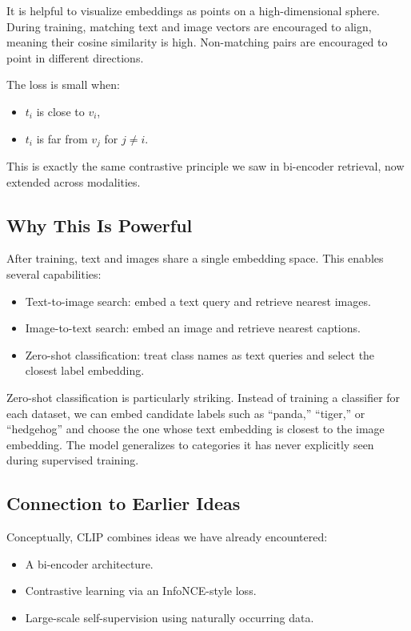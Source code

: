 It is helpful to visualize embeddings as points on a high-dimensional sphere. During training, matching text and image vectors are encouraged to align, meaning their cosine similarity is high. Non-matching pairs are encouraged to point in different directions.

The loss is small when:
\begin{itemize}
    \item $t_i$ is close to $v_i$,
    \item $t_i$ is far from $v_j$ for $j \neq i$.
\end{itemize}

This is exactly the same contrastive principle we saw in bi-encoder retrieval, now extended across modalities.

\bigskip
\subsection{Why This Is Powerful}
\medskip

After training, text and images share a single embedding space. This enables several capabilities:

\begin{itemize}
    \item Text-to-image search: embed a text query and retrieve nearest images.
    \item Image-to-text search: embed an image and retrieve nearest captions.
    \item Zero-shot classification: treat class names as text queries and select the closest label embedding.
\end{itemize}

Zero-shot classification is particularly striking. Instead of training a classifier for each dataset, we can embed candidate labels such as ``panda,'' ``tiger,'' or ``hedgehog'' and choose the one whose text embedding is closest to the image embedding. The model generalizes to categories it has never explicitly seen during supervised training.

\bigskip
\subsection{Connection to Earlier Ideas}
\medskip

Conceptually, CLIP combines ideas we have already encountered:

\begin{itemize}
    \item A bi-encoder architecture.
    \item Contrastive learning via an InfoNCE-style loss.
    \item Large-scale self-supervision using naturally occurring data.
\end{itemize}

